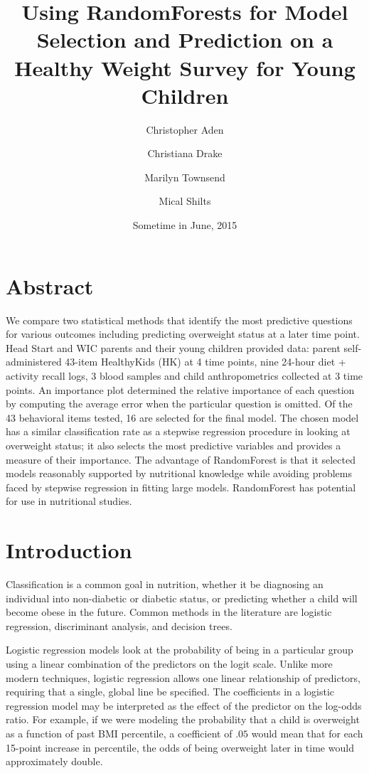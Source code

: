 \documentclass[11pt]{article}
\title{Using RandomForests for Model Selection and Prediction on a Healthy Weight Survey for Young Children}
\author{Christopher Aden \and Christiana Drake \and Marilyn Townsend \and Mical Shilts}
\date{Sometime in June, 2015}
\begin{document}
\maketitle

\section*{Abstract}
We compare two statistical methods that identify the most predictive questions for various outcomes including predicting overweight status at a later time point. Head Start and WIC parents and their young children provided data: parent self-administered 43-item HealthyKids (HK) at 4 time points, nine 24-hour diet + activity recall logs, 3 blood samples and child anthropometrics collected at 3 time points. An importance plot determined the relative importance of each question by computing the average error when the particular question is omitted. Of the 43 behavioral items tested, 16 are selected for the final model. The chosen model has a similar classification rate as a stepwise regression procedure in looking at overweight status; it also selects the most predictive variables and provides a measure of their importance. The advantage of RandomForest is that it selected models reasonably supported by nutritional knowledge while avoiding problems faced by stepwise regression in fitting large models. RandomForest has potential for use in nutritional studies.

\section*{Introduction}
Classification is a common goal in nutrition, whether it be diagnosing an individual into non-diabetic or diabetic status, or predicting whether a child will become obese in the future. Common methods in the literature are logistic regression, discriminant analysis, and decision trees.

Logistic regression models look at the probability of being in a particular group using a linear combination of the predictors on the logit scale. Unlike more modern techniques, logistic regression allows one linear relationship of predictors, requiring that a single, global line be specified. The coefficients in a logistic regression model may be interpreted as the effect of the predictor on the log-odds ratio. For example, if we were modeling the probability that a child is overweight as a function of past BMI percentile, a coefficient of $.05$ would mean that for each 15-point increase in percentile, the odds of being overweight later in time would approximately double.
\end{document}
